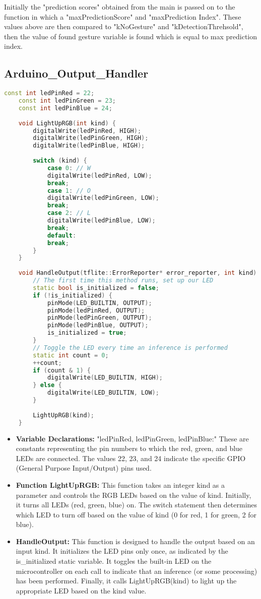 	Initially the "prediction scores" obtained from the main is passed on to the function in which a "maxPredictionScore" and "maxPrediction Index". These values above are then compared to "kNoGesture" and "kDetectionThrehsold", then the value of found gesture variable is found which is equal to max prediction index. 
	
	\subsection{Arduino\_Output\_Handler}
\begin{lstlisting}[language=C++, caption={LED Control Based on Gesture Recognition}, label={code:led-control}, style=bashstyle]
	const int ledPinRed = 22;
	const int ledPinGreen = 23;
	const int ledPinBlue = 24;
	
	void LightUpRGB(int kind) {
		digitalWrite(ledPinRed, HIGH);
		digitalWrite(ledPinGreen, HIGH);
		digitalWrite(ledPinBlue, HIGH);
		
		switch (kind) {
			case 0: // W
			digitalWrite(ledPinRed, LOW);
			break;
			case 1: // O
			digitalWrite(ledPinGreen, LOW);
			break;
			case 2: // L
			digitalWrite(ledPinBlue, LOW);
			break;
			default:
			break;
		}
	}
	
	void HandleOutput(tflite::ErrorReporter* error_reporter, int kind) {
		// The first time this method runs, set up our LED
		static bool is_initialized = false;
		if (!is_initialized) {
			pinMode(LED_BUILTIN, OUTPUT);
			pinMode(ledPinRed, OUTPUT);
			pinMode(ledPinGreen, OUTPUT);
			pinMode(ledPinBlue, OUTPUT);
			is_initialized = true;
		}
		// Toggle the LED every time an inference is performed
		static int count = 0;
		++count;
		if (count & 1) {
			digitalWrite(LED_BUILTIN, HIGH);
		} else {
			digitalWrite(LED_BUILTIN, LOW);
		}
		
		LightUpRGB(kind);
	}
\end{lstlisting}

		
		\begin{itemize}
			\item \textbf{Variable Declarations:}
			"ledPinRed, ledPinGreen, ledPinBlue:" These are constants representing the pin numbers to which the red, green, and blue LEDs are connected. The values 22, 23, and 24 indicate the specific GPIO (General Purpose Input/Output) pins used.
			\item \textbf{Function LightUpRGB:}
			This function takes an integer kind as a parameter and controls the RGB LEDs based on the value of kind.
			Initially, it turns all LEDs (red, green, blue) on.
			The switch statement then determines which LED to turn off based on the value of kind (0 for red, 1 for green, 2 for blue).
			\item \textbf{HandleOutput:}
			This function is designed to handle the output based on an input kind.
			It initializes the LED pins only once, as indicated by the is\_initialized static variable.
			It toggles the built-in LED on the microcontroller on each call to indicate that an inference (or some processing) has been performed.
			Finally, it calls LightUpRGB(kind) to light up the appropriate LED based on the kind value.
		\end{itemize}
		
